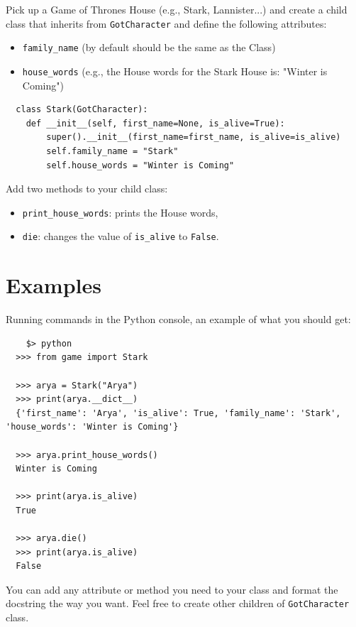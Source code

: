 \documentclass{42-en}
\begin{document}
Pick up a Game of Thrones House (e.g., Stark, Lannister...) and create a child class that inherits from \texttt{GotCharacter} and 
define the following attributes:
\begin{itemize}
  \item \texttt{family\_name} (by default should be the same as the Class)
  \item \texttt{house\_words} (e.g., the House words for the Stark House is: "Winter is Coming")
\end{itemize}

\begin{verbatim}
  class Stark(GotCharacter):
    def __init__(self, first_name=None, is_alive=True):
        super().__init__(first_name=first_name, is_alive=is_alive)
        self.family_name = "Stark"
        self.house_words = "Winter is Coming"
\end{verbatim}

Add two methods to your child class:
\begin{itemize}
  \item \texttt{print\_house\_words}: prints the House words,
  \item \texttt{die}: changes the value of \texttt{is\_alive} to \texttt{False}.
\end{itemize}

\section*{Examples}

Running commands in the Python console, an example of what you should get:

\begin{verbatim}
	$> python
  >>> from game import Stark
  
  >>> arya = Stark("Arya")
  >>> print(arya.__dict__)
  {'first_name': 'Arya', 'is_alive': True, 'family_name': 'Stark', 'house_words': 'Winter is Coming'}
  
  >>> arya.print_house_words()
  Winter is Coming
  
  >>> print(arya.is_alive)
  True
  
  >>> arya.die()
  >>> print(arya.is_alive)
  False
\end{verbatim}

You can add any attribute or method you need to your class and format the docstring the way you want.
Feel free to create other children of \texttt{GotCharacter} class.
\end{document}
